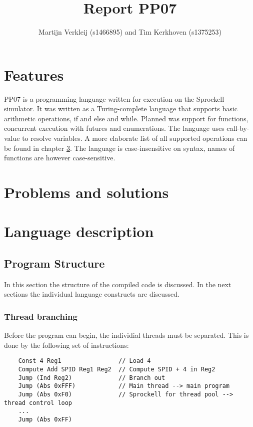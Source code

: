 \documentclass[10pt,a4paper]{report}
\author{Martijn Verkleij (s1466895) and Tim Kerkhoven (s1375253)}
\title{Report PP07}
\begin{document}
\maketitle
\tableofcontents


\chapter{Features}
PP07 is a programming language written for execution on the Sprockell simulator. It was written as a Turing-complete language that supports basic arithmetic operations, if and else and while. Planned was support for functions, concurrent execution with futures and enumerations. The language uses call-by-value to resolve variables. A more elaborate list of all supported operations can be found in chapter \ref{chp:langdesc}. The language is case-insensitive on syntax, names of functions are however case-sensitive.

\chapter{Problems and solutions}



\chapter{Language description} \label{chp:langdesc}

\section{Program Structure} \label{sec:structure}
In this section the structure of the compiled code is discussed. In the next sections the individual language constructs are discussed. 
\subsection{Thread branching}
Before the program can begin, the individial threads must be separated. This is done by the following set of instructions:
\begin{lstlisting}
	Const 4 Reg1				// Load 4
	Compute Add SPID Reg1 Reg2	// Compute SPID + 4 in Reg2
	Jump (Ind Reg2)				// Branch out
	Jump (Abs 0xFFF)			// Main thread --> main program
	Jump (Abs 0xF0)				// Sprockell for thread pool --> thread control loop
	...
	Jump (Abs 0xFF)
\end{lstlisting}
\end{document}
